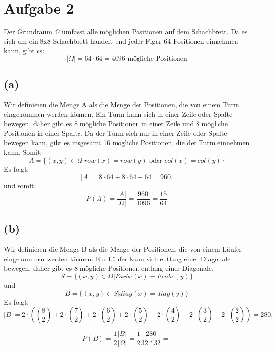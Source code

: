 \documentclass[a4paper]{scrartcl}
\begin{document}
\section*{Aufgabe 2}
Der Grundraum $\Omega$ umfasst alle möglichen Positionen auf dem Schachbrett. Da es sich um ein 8x8-Schachbrett handelt und jeder Figur 64 Positionen einnehmen kann, gibt es:
\[
  |\Omega| = 64 \cdot 64 = 4096 \text{ mögliche Positionen}
\]
\subsection*{(a)}
Wir definieren die Menge A als die Menge der Positionen, die von einem Turm eingenommen werden können. Ein Turm kann sich in einer Zeile oder Spalte bewegen, daher gibt es 8 mögliche Positionen in einer Zeile und 8 mögliche Positionen in einer Spalte.
Da der Turm sich nur in einer Zeile oder Spalte bewegen kann, gibt es insgesamt 16 mögliche Positionen, die der Turm einnehmen kann. Somit:
\[
  A = \{(x,y) \in \Omega  | row(x) = row(y) \text{ oder } col(x) = col(y)\}
\]
Es folgt:
\[
  |A| = 8 \cdot 64 + 8 \cdot 64 - 64 = 960.
\]
und somit:
\[
  P(A) = \frac{|A|}{|\Omega|} = \frac{960}{4096} = \frac{15}{64}
\]
\subsection*{(b)}
Wir definieren die Menge B als die Menge der Positionen, die von einem Läufer eingenommen werden können. Ein Läufer kann sich entlang einer Diagonale bewegen, daher gibt es 8 mögliche Positionen entlang einer Diagonale.
\[
  S = \{(x,y) \in \Omega  | Farbe(x) = Frabe(y)\}
\]
und
\[
  B = \{(x,y) \in S  | diag(x) = diag(y)\}
\]
Es folgt:
\[
  |B| = 2 \cdot (\binom{8}{2} + 2 \cdot \binom{7}{2} + 2 \cdot \binom{6}{2} + 2 \cdot \binom{5}{2} + 2 \cdot \binom{4}{2} + 2 \cdot \binom{3}{2} + 2 \cdot \binom{2}{2}) = 280.
\]

\[
  P(B) = \frac{1}{2}\frac{|B|}{|\Omega|} = \frac{1}{2}\frac{280}{32*32} = \frac{}{}
\]
\end{document}
